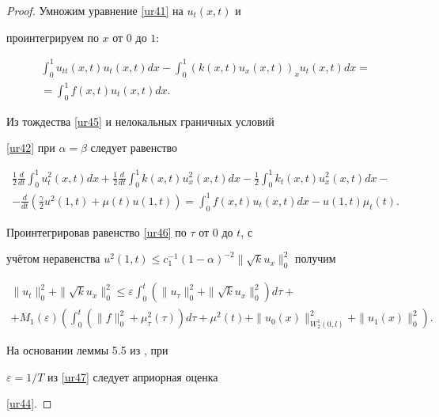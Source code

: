 \begin{proof} Умножим уравнение \eqref{ur41} на $u_t(x,t)$ и

проинтегрируем по $x$ от $0$ до $1$:

\begin{multline}

\int_{0}^{1}u_{tt}(x,t)u_t(x,t)dx-\int_{0}^{1}(k(x,t)u_x(x,t))_xu_t(x,t)dx=

\\

=\int_{0}^{1}f(x,t)u_t(x,t)dx.

 \label{ur45}

\end{multline}



Из тождества \eqref{ur45} и нелокальных граничных условий

\eqref{ur42} при $\alpha=\beta$  следует равенство

\begin{multline}

\frac{1}{2}\frac{d}{dt}\int_{0}^{1}u_t^2(x,t)dx+

\frac{1}{2}\frac{d}{dt}\int_{0}^{1}k(x,t)u_x^2(x,t)dx-\frac{1}{2}\int_{0}^{1}k_t(x,t)u_x^2(x,t)dx-

\\

-\frac{d}{dt}\left(\frac{\gamma}{2}u^2(1,t)+\mu(t)u(1,t)\right)=

\int_{0}^{1}f(x,t)u_t(x,t)dx-u(1,t)\mu_t(t).

 \label{ur46}

\end{multline}



Проинтегрировав равенство \eqref{ur46} по $\tau$ от $0$ до $t$, с

учётом неравенства $u^2(1,t)\leq

c_1^{-1}(1-\alpha)^{-2}\|\sqrt{k}u_x\|_0^2$ получим

\begin{multline}

\|u_t\|_0^2+\|\sqrt{k}u_x\|_0^2\leq

\varepsilon\int_{0}^{t}(\|u_\tau\|_0^2+\|\sqrt{k}u_x\|_0^2)d\tau+

\\

+M_1(\varepsilon)\left(\int_{0}^{t}(\|f\|_0^2+\mu_{\tau}^2(\tau))d\tau+\mu^2(t)+

\|u_0(x)\|_{W_2^1(0,l)}^2+\|u_1(x)\|_0^2\right).

 \label{ur47}

\end{multline}



На основании леммы 5.5 из \cite[стр. 112]{Lad}, при

$\varepsilon=1/T$ из \eqref{ur47} следует априорная оценка

\eqref{ur44}.

\end{proof}



